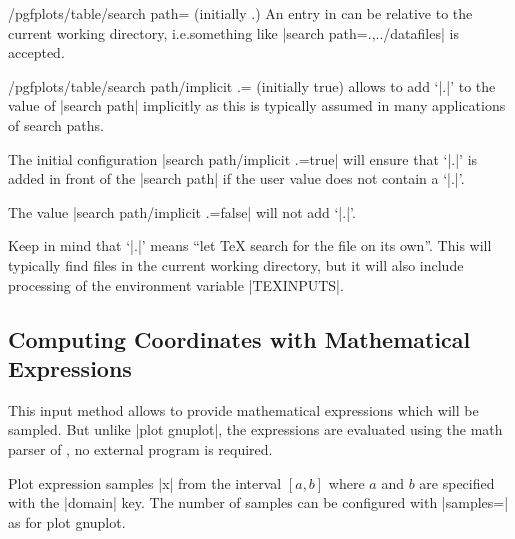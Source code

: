 {\begin{key}{/pgfplots/table/search path= (initially .)}
    An entry in  can be relative to the current
    working directory, i.e.\@ something like |search path={.,../datafiles}| is
    accepted.
\end{key}

\begin{key}{/pgfplots/table/search path/implicit .= (initially true)}
    \PGFPlotstable{} allows to add `|.|' to the value of |search path|
    implicitly as this is typically assumed in many applications of search
    paths.

    The initial configuration |search path/implicit .=true| will ensure that
    `|.|' is added in front of the |search path| if the user value does not
    contain a `|.|'.

    The value |search path/implicit .=false| will not add `|.|'.

    Keep in mind that `|.|' means ``let \TeX{} search for the file on its
    own''. This will typically find files in the current working directory, but
    it will also include processing of the environment variable |TEXINPUTS|.
\end{key}


\subsection{Computing Coordinates with Mathematical Expressions}

\begin{addplotoperation}[]{}{}

    This input method allows to provide mathematical expressions which will be
    sampled. But unlike |plot gnuplot|, the expressions are evaluated using the
    math parser of \PGF{}, no external program is required.

    Plot expression samples |x| from the interval $[a,b]$ where $a$ and $b$ are
    specified with the |domain| key. The number of samples can be configured
    with |samples=| as for plot gnuplot.
\begin{codeexample}[]
\end{codeexample}


\end{addplotoperation}}
